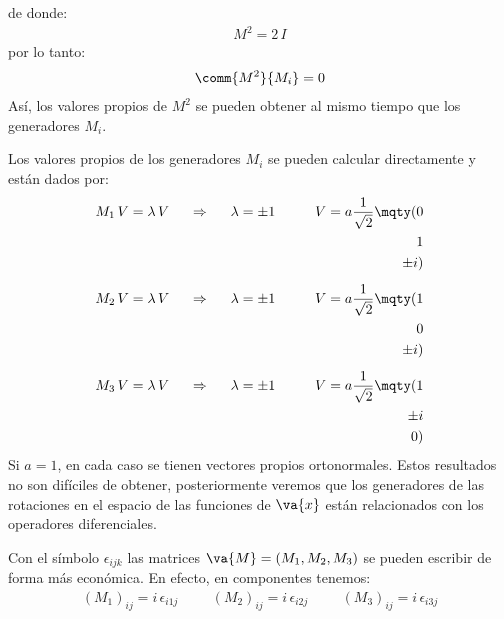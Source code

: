 de donde:
\begin{align}
M^{2} = 2 \, I
\label{eq:ecuacion_10_085}
\end{align}
por lo tanto:
\begin{align}
\comm{M^{2}}{M_{i}} = 0
\label{eq:ecuacion_10_086}
\end{align}
Así, los valores propios de $M^{2}$ se pueden obtener al mismo tiempo que los generadores $M_{i}$.
\par
Los valores propios de los generadores $M_{i}$ se pueden calcular directamente y están dados por:
\begin{align}
M_{1} \, V = \lambda \, V \hspace{0.5cm} \Rightarrow \hspace{0.5cm} \lambda = \pm 1 \hspace{1cm} V = a \dfrac{1}{\sqrt{2}} \mqty(0 \\ 1 \\ \pm i) \label{eq:ecuacion_10_087} \\[0.5em]
M_{2} \, V = \lambda \, V \hspace{0.5cm} \Rightarrow \hspace{0.5cm} \lambda = \pm 1 \hspace{1cm} V = a \dfrac{1}{\sqrt{2}} \mqty(1 \\ 0 \\ \pm i) \label{eq:ecuacion_10_088} \\[0.5em]
M_{3} \, V = \lambda \, V \hspace{0.5cm} \Rightarrow \hspace{0.5cm} \lambda = \pm 1 \hspace{1cm} V = a \dfrac{1}{\sqrt{2}} \mqty(1 \\ \pm i \\ 0) \label{eq:ecuacion_10_089}
\end{align}
Si $a = 1$, en cada caso se tienen vectores propios ortonormales. Estos resultados no son difíciles de obtener, posteriormente veremos que los generadores de las rotaciones en el espacio de las funciones de $\va{x}$ están relacionados con los operadores diferenciales.
\par
Con el símbolo $\epsilon_{ijk}$ las matrices $\va{M} = (M_{1}, M_{2}, M_{3})$ se pueden escribir de forma más económica. En efecto, en componentes tenemos:
\begin{align}
(M_{1})_{ij} = i \, \epsilon_{i 1 j} \hspace{1cm} (M_{2})_{ij} = i \, \epsilon_{i 2 j} \hspace{1cm} (M_{3})_{ij} = i \, \epsilon_{i 3 j} \label{eq:ecuacion_10_090}
\end{align}
